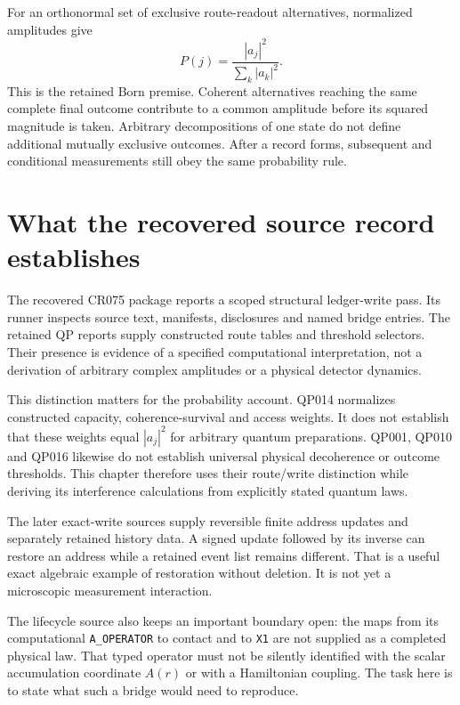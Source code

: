 For an orthonormal set of exclusive route-readout alternatives, normalized amplitudes give
\begin{equation}
 P(j)=\frac{|a_j|^2}{\sum_k|a_k|^2}.
\end{equation}
This is the retained Born premise.\cite{Born1926} Coherent alternatives reaching the same complete final outcome contribute to a common amplitude before its squared magnitude is taken. Arbitrary decompositions of one state do not define additional mutually exclusive outcomes. After a record forms, subsequent and conditional measurements still obey the same probability rule.

\section{What the recovered source record establishes}
The recovered CR075 package reports a scoped structural ledger-write pass. Its runner inspects source text, manifests, disclosures and named bridge entries. The retained QP reports supply constructed route tables and threshold selectors. Their presence is evidence of a specified computational interpretation, not a derivation of arbitrary complex amplitudes or a physical detector dynamics.\cite{cr075}

This distinction matters for the probability account. QP014 normalizes constructed capacity, coherence-survival and access weights. It does not establish that these weights equal $|a_j|^2$ for arbitrary quantum preparations. QP001, QP010 and QP016 likewise do not establish universal physical decoherence or outcome thresholds. This chapter therefore uses their route/write distinction while deriving its interference calculations from explicitly stated quantum laws.

The later exact-write sources supply reversible finite address updates and separately retained history data. A signed update followed by its inverse can restore an address while a retained event list remains different. That is a useful exact algebraic example of restoration without deletion. It is not yet a microscopic measurement interaction.\cite{writealgebra}

The lifecycle source also keeps an important boundary open: the maps from its computational \texttt{A\_OPERATOR} to contact and to \texttt{X1} are not supplied as a completed physical law. That typed operator must not be silently identified with the scalar accumulation coordinate $A(r)$ or with a Hamiltonian coupling.\cite{lifecycle} The task here is to state what such a bridge would need to reproduce.

